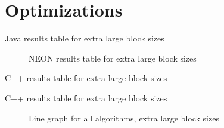 \section{Optimizations}

\begin{table}
    \centering
    \caption{Java results table for extra large block sizes}
    \label{tab:java:extra}
    
\end{table}

\begin{figure}
    \centering
    
    \caption{NEON results table for extra large block sizes}
    \label{fig:neon:line:extra}
\end{figure}

\begin{table}
    \centering
    
    \caption{C++ results table for extra large block sizes}
    \label{tab:cpp:extra}
\end{table}

\begin{table}
    \centering
    \resizebox{\columnwidth}{!}{
        
    }
    \caption{C++ results table for extra large block sizes}
    \label{tab:cpp:extra}
\end{table}

\begin{figure}
    \centering
    
    \caption{Line graph for all algorithms, extra large block sizes}
    \label{fig:all:line:extra}
\end{figure}

